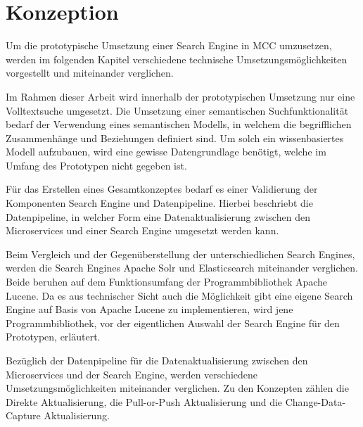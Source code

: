 \chapter{Konzeption\label{chap4:Viertes-Kapitel}}

Um die prototypische Umsetzung einer Search Engine in MCC umzusetzen, werden im folgenden Kapitel verschiedene technische Umsetzungsmöglichkeiten vorgestellt und miteinander verglichen.


Im Rahmen dieser Arbeit wird innerhalb der prototypischen Umsetzung nur eine Volltextsuche umgesetzt. Die Umsetzung einer semantischen Suchfunktionalität bedarf der Verwendung eines semantischen Modells, in welchem die begrifflichen Zusammenhänge und Beziehungen definiert sind. Um solch ein wissenbasiertes Modell aufzubauen, wird eine gewisse Datengrundlage benötigt, welche im Umfang des Prototypen nicht gegeben ist.


Für das Erstellen eines Gesamtkonzeptes bedarf es einer Validierung der Komponenten \glqq Search Engine\grqq{} und \glqq Datenpipeline\grqq{}. Hierbei beschriebt die Datenpipeline, in welcher Form eine Datenaktualisierung zwischen den Microservices und einer Search Engine umgesetzt werden kann.

Beim Vergleich und der Gegenüberstellung der unterschiedlichen Search Engines, werden die Search Engines \glqq Apache Solr\grqq{} und \glqq Elasticsearch\grqq{} miteinander verglichen. Beide beruhen auf dem Funktionsumfang der Programmbibliothek \glqq Apache Lucene\grqq{}. Da es aus technischer Sicht auch die Möglichkeit gibt eine eigene Search Engine auf Basis von \glqq Apache Lucene\grqq{} zu implementieren, wird jene Programmbibliothek, vor der eigentlichen Auswahl der Search Engine für den Prototypen, erläutert.

Bezüglich der Datenpipeline für die Datenaktualisierung zwischen den Microservices und der Search Engine, werden verschiedene Umsetzungsmöglichkeiten miteinander verglichen. Zu den Konzepten zählen die \glqq Direkte Aktualisierung\grqq{}, die \glqq Pull-or-Push Aktualisierung\grqq{} und die \glqq Change-Data-Capture Aktualisierung\grqq{}.

